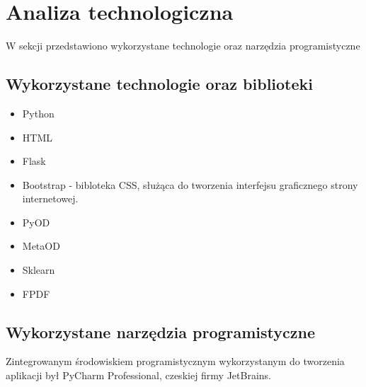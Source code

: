 \section{Analiza technologiczna}
W sekcji przedstawiono wykorzystane technologie oraz narzędzia programistyczne 
\subsection{Wykorzystane technologie oraz biblioteki}
\begin{itemize}
    \item Python
    \item HTML
    \item Flask
    \item Bootstrap - bibloteka CSS, służąca do tworzenia interfejsu graficznego strony internetowej. 
    \item PyOD
    \item MetaOD
    \item Sklearn
    \item FPDF
\end{itemize}
\subsection{Wykorzystane narzędzia programistyczne}
Zintegrowanym środowiskiem programistycznym wykorzystanym do tworzenia aplikacji był PyCharm Professional, czeskiej firmy JetBrains. 